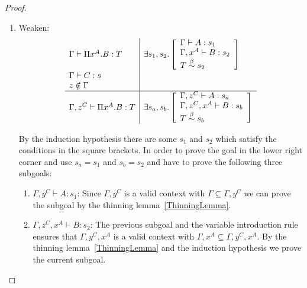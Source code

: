 \begin{theorem}
\begin{proof}
\begin{enumerate}
            \begin{enumerate}
            \item Weaken:
                $$
                \begin{array}{l|l}
                    \Gamma \vdash \Pi x^A. B : T
                    &
                    \exists s_1, s_2.
                    \left[
                    \begin{array}{l}
                        \Gamma \vdash A : s_1
                        \\
                        \Gamma, x^A \vdash B : s_2
                        \\
                        T \stackrel{\beta}{\sim} s_2
                    \end{array}
                    \right]
                    \\
                    \Gamma \vdash C: s
                    \\
                    z \notin \Gamma
                    \\
                    \hline
                    \Gamma, z^C \vdash \Pi x^A. B: T
                    &
                    \exists s_a, s_b.
                    \left[
                    \begin{array}{l}
                        \Gamma, z^C \vdash A : s_a
                        \\
                        \Gamma, z^C, x^A \vdash B : s_b
                        \\
                        T \stackrel{\beta}{\sim} s_b
                    \end{array}
                    \right]
                \end{array}
                $$

                By the induction hypothesis there are some $s_1$ and $s_2$ which
                satisfy the conditions in the square brackets. In order to prove
                    the goal in the lower right corner and use $s_a = s_1$ and
                    $s_b = s_2$ and have to prove the following three subgoals:
                \begin{enumerate}
                \item $\Gamma, y^C \vdash A : s_1$: Since $\Gamma,y^C$ is a
                    valid context with $\Gamma \subseteq \Gamma,y^C$ we can
                        prove the subgoal by the thinning
                        lemma~\ref{ThinningLemma}.

                \item $\Gamma, z^C, x^A \vdash B : s_2 $: The previous subgoal
                    and the variable introduction rule ensures that
                        $\Gamma,y^C,x^A$ is a valid context with $\Gamma,x^A
                        \subseteq \Gamma,y^C,x^A$. By the thinning
                        lemma~\ref{ThinningLemma} and the induction hypothesis
                        we prove the current subgoal.


\end{enumerate}
\end{enumerate}
\end{enumerate}
\end{proof}
\end{theorem}
